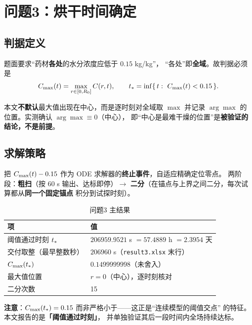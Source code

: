 \section{问题3：烘干时间确定}

\subsection{判据定义}

题面要求``药材\textbf{各处}的水分浓度应低于 $0.15$ kg/kg''，
``各处''即\textbf{全域}。故判据必须是
\begin{equation}
  C_{\max}(t)=\max_{r\in[0,R_0]}C(r,t),
  \qquad
  t_{*}=\inf\{\,t:\ C_{\max}(t)<0.15\,\}.
\end{equation}

本文\textbf{不默认}最大值出现在中心，而是逐时刻对全域取 $\max$ 并记录
$\arg\max$ 的位置。实测确认 $\arg\max\equiv0$（中心），
即``中心是最难干燥的位置''是\textbf{被验证的结论，不是前提}。

\subsection{求解策略}

把 $C_{\max}(t)-0.15$ 作为 ODE 求解器的\textbf{终止事件}，自适应精确定位零点。
两阶段：\textbf{粗扫}（按 60 s 输出、达标即停）$\to$
\textbf{二分}（在锚点与上界之间二分，每次试算都从\textbf{同一个固定锚点}
积分到试探时刻）。

\begin{table}[H]
  \centering
  \caption{问题3 主结果}
  \label{tab:p3main}
  \footnotesize
  \begin{tabular}{@{}ll@{}}
    \toprule
    项 & 值 \\
    \midrule
    阈值通过时刻 $t_{*}$ & $\mathbf{206959.9521}$ s $=\mathbf{57.4889}$ h $=2.3954$ 天 \\
    交付取整（最早整数秒） & $206960$ s（\texttt{result3.xlsx} 末行） \\
    $C_{\max}(t_{*})$ & $0.1499999998$（未舍入） \\
    最大值位置 & $r=0$（中心），逐时刻核对 \\
    二分次数 & 15 \\
    \bottomrule
  \end{tabular}
\end{table}

\textbf{注意}：$C_{\max}(t_{*})=0.15$ 而非严格小于——这正是``连续模型的阈值交点''
的特征。本文报告的是\textbf{「阈值通过时刻」}，
并单独验证其后一段时间内全场持续达标。

